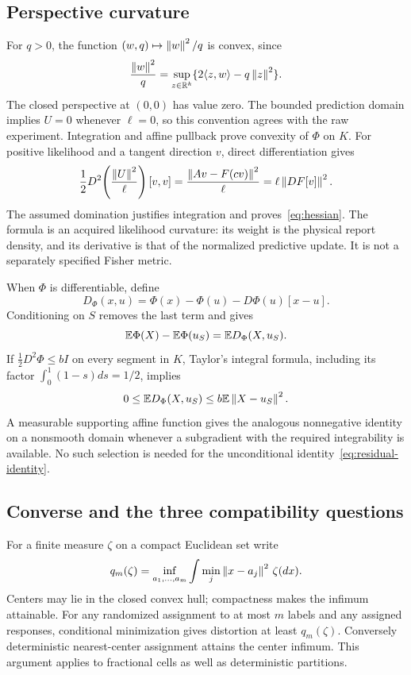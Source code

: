 \subsection{Perspective curvature}
For $q>0$, the function $(w,q)\mapsto\left\lVert w\right\rVert^2/q$ is convex, since
\[
 \frac{\left\lVert w\right\rVert^2}{q}=\sup_{z\in\mathbb R^k}\{2\langle z,w\rangle-q\left\lVert z\right\rVert^2\}.
\]
The closed perspective at $(0,0)$ has value zero. The bounded prediction domain implies $U=0$ whenever $\ell=0$, so this convention agrees with the raw experiment. Integration and affine pullback prove convexity of $\Phi$ on $K$. For positive likelihood and a tangent direction $v$, direct differentiation gives
\begin{equation}\label{eq:perspective-hessian}
 \frac12D^2\!\left(\frac{\left\lVert U\right\rVert^2}{\ell}\right)[v,v]
 =\frac{\left\lVert A v-F(c v)\right\rVert^2}{\ell}
 =\ell\left\lVert D F[v]\right\rVert^2.
\end{equation}
The assumed domination justifies integration and proves~\eqref{eq:hessian}. The formula is an acquired likelihood curvature: its weight is the physical report density, and its derivative is that of the normalized predictive update. It is not a separately specified Fisher metric.

When $\Phi$ is differentiable, define
\[
 D_\Phi(x,u)=\Phi(x)-\Phi(u)-D\Phi(u)[x-u].
\]
Conditioning on $S$ removes the last term and gives
\begin{equation}\label{eq:bregman}
 \mathbb E\Phi(X)-\mathbb E\Phi(u_S)=\mathbb E D_\Phi(X,u_S).
\end{equation}
If $\frac12D^2\Phi\le b I$ on every segment in $K$, Taylor's integral formula, including its factor $\int_0^1(1-s)ds=1/2$, implies
\begin{equation}\label{eq:jensen-upper}
 0\le \mathbb E D_\Phi(X,u_S)\le b\mathbb E\left\lVert X-u_S\right\rVert^2.
\end{equation}
A measurable supporting affine function gives the analogous nonnegative identity on a nonsmooth domain whenever a subgradient with the required integrability is available. No such selection is needed for the unconditional identity~\eqref{eq:residual-identity}.

\subsection{Converse and the three compatibility questions}
For a finite measure $\zeta$ on a compact Euclidean set write
\[
 q_m(\zeta)=\inf_{a_1,\ldots,a_m}\int\min_j\left\lVert x-a_j\right\rVert^2\,\zeta(dx).
\]
Centers may lie in the closed convex hull; compactness makes the infimum attainable. For any randomized assignment to at most $m$ labels and any assigned responses, conditional minimization gives distortion at least $q_m(\zeta)$. Conversely deterministic nearest-center assignment attains the center infimum. This argument applies to fractional cells as well as deterministic partitions.

